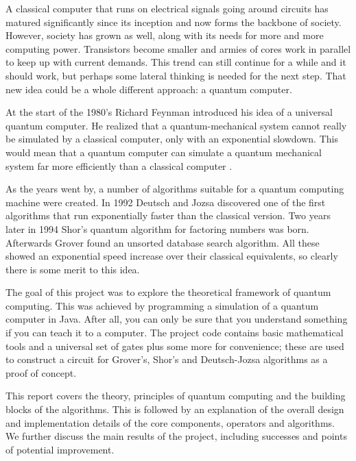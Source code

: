 A classical computer that runs on electrical signals going around circuits has matured significantly since its inception and now forms the backbone of society. However, society has grown as well, along with its needs for more and more computing power. Transistors become smaller and armies of cores work in parallel to keep up with current demands. This trend can still continue for a while and it should work, but perhaps some lateral thinking is needed for the next step. That new idea could be a whole different approach: a quantum computer.

At the start of the 1980's Richard Feynman introduced his idea of a universal quantum computer. He realized that a quantum-mechanical system cannot really be simulated by a classical computer, only with an exponential slowdown. This would mean that a quantum computer can simulate a quantum mechanical system far more efficiently than a classical computer \cite{feynman1982}.

As the years went by, a number of algorithms suitable for a quantum computing machine were created. In 1992 Deutsch and Jozsa discovered one of the first algorithms that run exponentially faster than the classical version. Two years later in 1994 Shor's quantum algorithm for factoring numbers was born. Afterwards Grover found an unsorted database search algorithm. All these showed an exponential speed increase over their classical equivalents, so clearly there is some merit to this idea. 

The goal of this project was to explore the theoretical framework of quantum computing. This was achieved by programming a simulation of a quantum computer in Java. After all, you can only be sure that you understand something if you can teach it to a computer. The project code contains basic mathematical tools and a universal set of gates plus some more for convenience; these are used to construct a circuit for Grover's, Shor's and Deutsch-Jozsa algorithms as a proof of concept.

This report covers the theory, principles of quantum computing and the building blocks of the algorithms. This is followed by an explanation of the overall design and implementation details of the core components, operators and algorithms. We further discuss the main results of the project, including successes and points of potential improvement.
